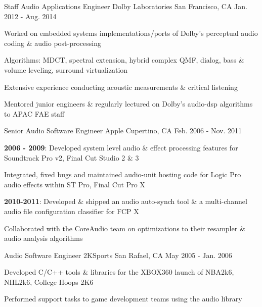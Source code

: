 \begin{cventries}
  \cventry
    {Staff Audio Applications Engineer} %
    {Dolby Laboratories} %
    {San Francisco, CA} %
    {Jan. 2012 - Aug. 2014} %
    {
      \begin{cvitems} %
        \item {Worked on embedded systems implementations/ports of Dolby's perceptual audio coding \& audio post-processing}
        \item {Algorithms: MDCT, spectral extension, hybrid complex QMF, dialog, bass \& volume leveling, surround virtualization}
		\item {Extensive experience conducting acoustic measurements \& critical listening}
        \item {Mentored junior engineers \& regularly lectured on Dolby's audio-dsp algorithms to APAC FAE staff}
      \end{cvitems}
    }

  \cventry
    {Senior Audio Software Engineer} %
    {Apple} %
    {Cupertino, CA} %
    {Feb. 2006 - Nov. 2011} %
    {
      \begin{cvitems} %
        \item {\textbf{2006 - 2009}: Developed system level audio \& effect processing features for Soundtrack Pro v2, Final Cut Studio 2 \& 3} 
        \item {Integrated, fixed bugs and maintained audio-unit hosting code for Logic Pro audio effects within ST Pro, Final Cut Pro X}
        \item {\textbf{2010-2011}: Developed \& shipped an audio auto-synch tool \& a multi-channel audio file configuration classifier for FCP X}        
		\item {Collaborated with the CoreAudio team on optimizations to their resampler \& audio analysis algorithms}
      \end{cvitems}
    }

  \cventry
    {Audio Software Engineer} %
    {2KSports} %
    {San Rafael, CA} %
    {May 2005 - Jan. 2006} %
    {
      \begin{cvitems} %
        \item {Developed C/C++ tools \& libraries for the XBOX360 launch of NBA2k6, NHL2k6, College Hoops 2K6}
        \item {Performed support tasks to game development teams using the audio library}
      \end{cvitems}
    }

\end{cventries}
	